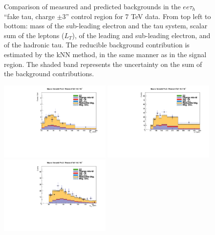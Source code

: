 \begin{figure}
\begin{center}
  \caption{Comparison of measured and predicted backgrounds in the $ee\tau_h$ ``fake tau, charge $\pm3$'' control region for 7 TeV data.
  From top left to bottom: mass of the sub-leading electron and the tau system, scalar sum of the leptons \pT ($L_T$), \pT of the leading and sub-leading electron, and \pT of the hadronic tau.
  The reducible background contribution is estimated by the kNN method, in the same manner as in the signal region.
  The shaded band represents the uncertainty on the sum of the background contributions.
  }
  \label{fig:LLT_eet_f3_charge3_control_7TeV}
\end{center}
\end{figure}

\begin{figure}
\begin{center}
  \includegraphics[width=0.49\textwidth]{4_Analisys/pics/8TeV/plots/eet/f3/Full_charge3/final-f3-subMass-Full.pdf}
  \includegraphics[width=0.49\textwidth]{4_Analisys/pics/8TeV/plots/eet/f3/final-f3-LT-charge3.pdf}\\
  \includegraphics[width=0.49\textwidth]{4_Analisys/pics/8TeV/plots/eet/f3/Full_charge3/final-f3-e1Pt-Full.pdf}

\end{center}
\end{figure}
